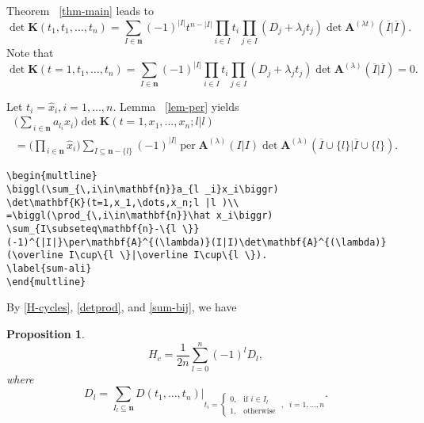 \documentclass[draft]{amsart}
\newtheorem{prop}[thm]{Proposition}
\theoremstyle{definition}
\theoremstyle{remark}
\newcommand{\per}{\operatorname{per}}
\begin{document}
Theorem ~\ref{thm-main} leads to
\begin{equation}\label{detK1}
\det\mathbf{K}(t_1,t_1,\dots,t_n)=\sum_{I\in\mathbf{n}}(-1)^{|I|}t^{n-|I|}
\prod_{i\in I}t_i\prod_{j\in I}(D_j+\lambda_jt_j)\det\mathbf{A}
^{(\lambda t)}(\overline{I}|\overline I).
\end{equation}
Note that
\begin{equation}\label{detK2}
\det\mathbf{K}(t=1,t_1,\dots,t_n)=\sum_{I\in\mathbf{n}}(-1)^{|I|}
\prod_{i\in I}t_i\prod_{j\in I}(D_j+\lambda_jt_j)\det\mathbf{A}
^{(\lambda)}(\overline{I}|\overline{I})=0.
\end{equation}

Let $t_i=\hat x_i,i=1,\dots,n$. Lemma ~\ref{lem-per} yields
\begin{multline}
\biggl(\sum_{\,i\in\mathbf{n}}a_{l _i}x_i\biggr)
\det\mathbf{K}(t=1,x_1,\dots,x_n;l |l )\\
=\biggl(\prod_{\,i\in\mathbf{n}}\hat x_i\biggr)
\sum_{I\subseteq\mathbf{n}-\{l \}}
(-1)^{|I|}\per\mathbf{A}^{(\lambda)}(I|I)\det\mathbf{A}^{(\lambda)}
(\overline I\cup\{l \}|\overline I\cup\{l \}).
\label{sum-ali}
\end{multline}
\begin{verbatim}
\begin{multline}
\biggl(\sum_{\,i\in\mathbf{n}}a_{l _i}x_i\biggr)
\det\mathbf{K}(t=1,x_1,\dots,x_n;l |l )\\
=\biggl(\prod_{\,i\in\mathbf{n}}\hat x_i\biggr)
\sum_{I\subseteq\mathbf{n}-\{l \}}
(-1)^{|I|}\per\mathbf{A}^{(\lambda)}(I|I)\det\mathbf{A}^{(\lambda)}
(\overline I\cup\{l \}|\overline I\cup\{l \}).
\label{sum-ali}
\end{multline}
\end{verbatim}

By \eqref{H-cycles}, \eqref{detprod}, and \eqref{sum-bij}, we have
\begin{prop}\label{prop:eg}
\begin{equation}
H_c=\frac1{2n}\sum^n_{l =0}(-1)^{l}
D_{l},
\end{equation}
where
\begin{equation}\label{delta-l}
D_{l}=\sum_{I_{l}\subseteq \mathbf{n}}
D(t_1,\dots,t_n)\Bigr|
_{t_i=\left\{\begin{smallmatrix}
0,& \text{if }i\in I_{l}\quad\\%
1,& \text{otherwise}\end{smallmatrix}\right.\;,\;\; i=1,\dots,n}.
\end{equation}
\end{prop}
\end{document}

